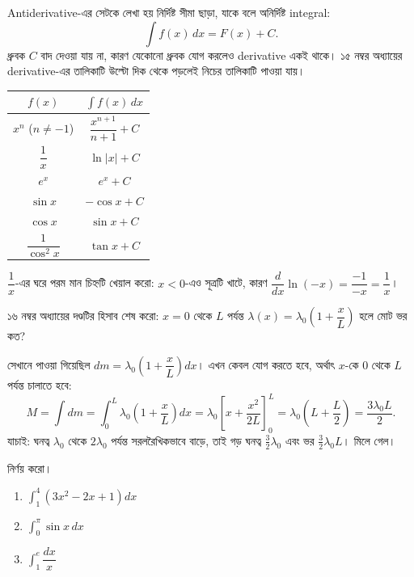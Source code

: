 \documentclass[11pt]{article}
\begin{document}
Antiderivative-এর সেটকে লেখা হয় নির্দিষ্ট সীমা ছাড়া, যাকে বলে অনির্দিষ্ট
integral:
\[
  \int f(x)\,dx = F(x) + C .
\]
ধ্রুবক $C$ বাদ দেওয়া যায় না, কারণ যেকোনো ধ্রুবক যোগ করলেও derivative একই
থাকে। ১৫ নম্বর অধ্যায়ের derivative-এর তালিকাটি উল্টো দিক থেকে পড়লেই
নিচের তালিকাটি পাওয়া যায়।

\begin{center}
\begin{tabular}{c|c}
 $f(x)$ & $\int f(x)\,dx$ \\ \hline
 $x^{n}$ ($n \neq -1$) & $\dfrac{x^{n+1}}{n+1} + C$ \\[1mm]
 $\dfrac{1}{x}$ & $\ln|x| + C$ \\[1mm]
 $e^{x}$ & $e^{x} + C$ \\[1mm]
 $\sin x$ & $-\cos x + C$ \\[1mm]
 $\cos x$ & $\sin x + C$ \\[1mm]
 $\dfrac{1}{\cos^{2}x}$ & $\tan x + C$ \\
\end{tabular}
\end{center}

$\dfrac{1}{x}$-এর ঘরে পরম মান চিহ্নটি খেয়াল করো: $x<0$-এও সূত্রটি খাটে, কারণ
$\dfrac{d}{dx}\ln(-x) = \dfrac{-1}{-x} = \dfrac{1}{x}$।

\begin{example}
১৬ নম্বর অধ্যায়ের দণ্ডটির হিসাব শেষ করো: $x = 0$ থেকে $L$ পর্যন্ত
$\lambda(x) = \lambda_{0}\left( 1 + \dfrac{x}{L} \right)$ হলে মোট ভর কত?
\end{example}

\begin{solbox}
সেখানে পাওয়া গিয়েছিল $dm = \lambda_{0}\left( 1 + \dfrac{x}{L} \right)dx$।
এখন কেবল যোগ করতে হবে, অর্থাৎ $x$-কে $0$ থেকে $L$ পর্যন্ত চালাতে হবে:
\[
  M = \int dm = \int_{0}^{L}\lambda_{0}\left( 1 + \frac{x}{L} \right)dx
    = \lambda_{0}\left[ x + \frac{x^{2}}{2L} \right]_{0}^{L}
    = \lambda_{0}\left( L + \frac{L}{2} \right) = \frac{3\lambda_{0}L}{2} .
\]
যাচাই: ঘনত্ব $\lambda_{0}$ থেকে $2\lambda_{0}$ পর্যন্ত সরলরৈখিকভাবে বাড়ে, তাই
গড় ঘনত্ব $\tfrac{3}{2}\lambda_{0}$ এবং ভর $\tfrac{3}{2}\lambda_{0}L$। মিলে
গেল।
\end{solbox}

 নির্ণয় করো।
\begin{enumerate}
  \item $\int_{1}^{4}\left( 3x^{2} - 2x + 1 \right)dx$
  \item $\int_{0}^{\pi} \sin x\,dx$
  \item $\int_{1}^{e} \dfrac{dx}{x}$
\end{enumerate}
\end{document}
